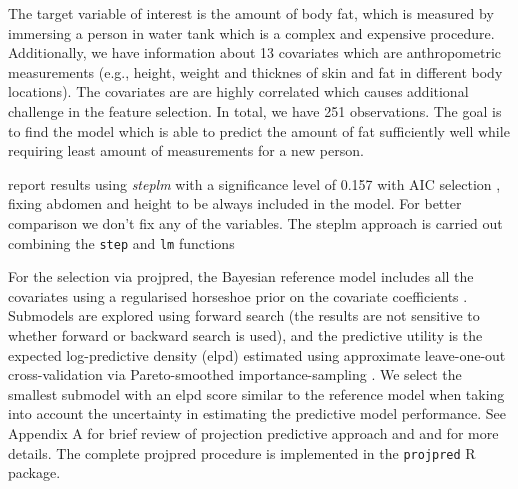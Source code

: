 \documentclass[american,]{article}
\theoremstyle{definition}
\begin{document}
The target variable of interest is the amount of body fat, which is
measured by immersing a person in water tank which is a complex and
expensive procedure. Additionally, we have information about 13
covariates which are anthropometric measurements (e.g., height, weight
and thicknes of skin and fat in different body locations). The
covariates are are highly correlated which causes additional
challenge in the feature selection. In total, we have 251
observations. The goal is to find the model which is able to predict
the amount of fat sufficiently well while requiring least amount of
measurements for a new person.

\cite{paper:bodyfat} report results using \emph{steplm} with a significance
level of 0.157 with AIC selection \citep{akaike1974new}, fixing
abdomen and height to be always included in the model. For better
comparison we don't fix any of the variables.  The steplm approach is
carried out combining the \texttt{step} and \texttt{lm} functions

For the selection via projpred, the Bayesian reference model includes
all the covariates using a regularised horseshoe prior on the
covariate coefficients \citep{paper:rhs}. Submodels are explored using
forward search (the results are not sensitive to whether forward or
backward search is used), and the predictive utility is the expected
log-predictive density (elpd) estimated using approximate leave-one-out cross-validation via Pareto-smoothed importance-sampling
\citep[PSIS-LOO-CV; ][]{paper:psis_loo}.  We select the smallest  submodel with an elpd score similar to the reference model
when taking into account the uncertainty in estimating the predictive
model performance. See Appendix A for brief review of projection
predictive approach and \citet{paper:model_selection} and
\citet{paper:projpred} for more details. The complete projpred procedure is implemented in the \texttt{projpred} R package.
\end{document}
